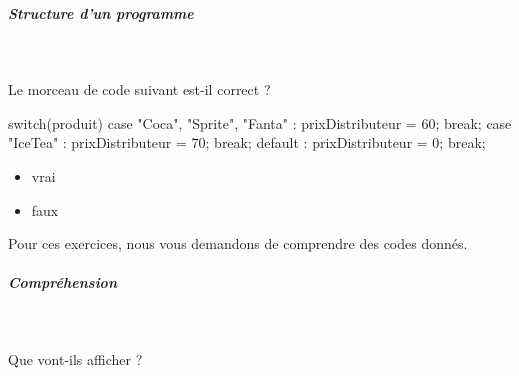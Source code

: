 \documentclass[11pt,a4paper]{article}
\begin{document}
		\subparagraph{Structure d'un programme} 
		
                \textcolor{white}{.} \par
            Le morceau de code suivant est-il correct ?
					  \begin{Java}
switch(produit) {
        case "Coca", "Sprite", "Fanta" :
          prixDistributeur = 60;
          break;
      case "IceTea" :
          prixDistributeur = 70;
          break;
      default :
          prixDistributeur = 0;
          break;
      }\end{Java}
            \begin{itemize} 
        
            \item[ \ding{"6D} ]  
							vrai
            
        
            \item[ \ding{"6D} ]  
							faux
            
        
            \end{itemize} 
        
          Pour ces exercices, nous vous demandons de comprendre des codes donn\'es. 
        
            \par
        
			
		\subparagraph{Compr\'ehension} 
		
                \textcolor{white}{.} \par
            
							  Que vont-ils afficher ?
              
\end{document}

